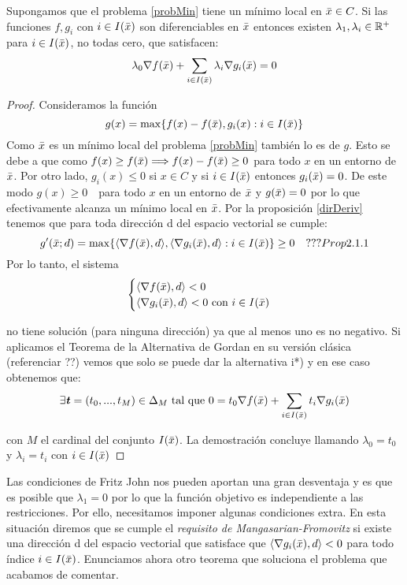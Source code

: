 		\begin{teoremaBox}\label{FritzJohn}
			Supongamos que el problema \ref{probMin} tiene un mínimo local en $ \bar{x} \in C $. Si las funciones $ f, g_i $ con $ i \in I(\bar{x}) $ son diferenciables en $ \bar{x} $ entonces existen $ \lambda_1, \lambda_i \in \mathbb{R}^+ $ para $ i \in I(\bar{x}) $, no todas cero, que satisfacen:
			\[
			\lambda_0 \nabla f(\bar{x}) + \sum_{i \in I(\bar{x})} \lambda_i \nabla g_i(\bar{x}) = 0
			\]
		\end{teoremaBox}
		\begin{proof}
			Consideramos la función 
			\[
			g(x) = \max \{ f(x) - f(\bar{x}), g_i(x) : i \in I(\bar{x})\}
			\]
			Como $ \bar{x} $ es un mínimo local del problema \ref{probMin} también lo es de $ g $. Esto se debe a que como $ f(x) \geq f(\bar{x}) \Longrightarrow  f(x) - f(\bar{x}) \geq 0$ para todo $ x $ en un entorno de $ \bar{x} $. Por otro lado, $ g_i(x) \leq 0 $ si $ x \in C $ y si $ i \in I(\bar{x}) $ entonces $ g_i(\bar{x})=0 $. De este modo $ g(x) \geq 0 \text{ } $ para todo $ x $ en un entorno de $ \bar{x} $ y $ g(\bar{x}) = 0 $ por lo que efectivamente alcanza un mínimo local en $ \bar{x} $. Por la proposición \ref{dirDeriv} tenemos que para toda dirección d del espacio vectorial se cumple:
			\[
			g'(\bar{x};d) = \max \{ \langle \nabla f(\bar{x}), d\rangle , \langle \nabla g_i(\bar{x}),d \rangle : i \in I(\bar{x})\} \geq 0 \quad ???Prop2.1.1 
			\]
			Por lo tanto, el sistema 
			\begin{equation*}
			\begin{cases}
			\langle \nabla f(\bar{x}), d\rangle  < 0 \\
			\langle \nabla g_i(\bar{x}),d \rangle < 0\text{ con } i \in I(\bar{x})
			\end{cases}
			\end{equation*}
			
			no tiene solución (para ninguna dirección) ya que al menos uno es no negativo. Si aplicamos el Teorema de la Alternativa de Gordan en su versión clásica (referenciar ??) vemos que solo se puede dar la alternativa i*) y en ese caso obtenemos que:
			\[
			 \exists \textbf{\emph{t}} = (t_0, ..., t_{M})\in \Delta_{M}  \text{ tal que }0 = t_0 \nabla f(\bar{x}) + \sum_{i \in I(\bar{x})}  t_i \nabla g_i (\bar{x})
			 \]
			 
			con $ M $ el cardinal del conjunto $ I(\bar{x}) $. La demostración concluye llamando $ \lambda_0 = t_0 $ y $ \lambda_i = t_i $ con $ i \in I(\bar{x}) $
		\end{proof}
	
		Las condiciones de Fritz John nos pueden aportan una gran desventaja y es que es posible que $ \lambda_1 = 0 $ por lo que la función objetivo es independiente a las restricciones. Por ello, necesitamos imponer algunas condiciones extra. En esta situación diremos que se cumple el \textit{requisito de Mangasarian-Fromovitz} si existe una dirección d del espacio vectorial que satisface que $ \langle \nabla g_i(\bar{x}),d \rangle < 0 $ para todo índice $ i \in I(\bar{x})$. Enunciamos ahora otro teorema que soluciona el problema que acabamos de comentar.
		
